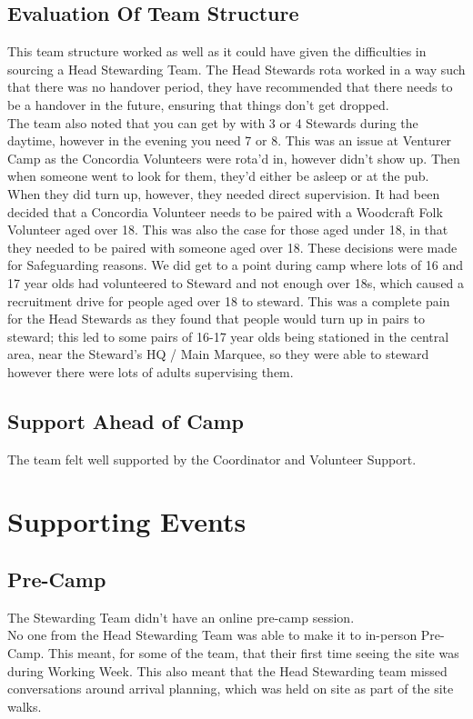 \subsection{Evaluation Of Team Structure}
This team structure worked as well as it could have given the difficulties in sourcing a Head Stewarding Team. The Head Stewards rota worked in a way such that there was no handover period, they have recommended that there needs to be a handover in the future, ensuring that things don't get dropped. \\

The team also noted that you can get by with 3 or 4 Stewards during the daytime, however in the evening you need 7 or 8. This was an issue at Venturer Camp as the Concordia Volunteers were rota'd in, however didn't show up. Then when someone went to look for them, they'd either be asleep or at the pub. When they did turn up, however, they needed direct supervision. It had been decided that a Concordia Volunteer needs to be paired with a Woodcraft Folk Volunteer aged over 18. This was also the case for those aged under 18, in that they needed to be paired with someone aged over 18. These decisions were made for Safeguarding reasons. We did get to a point during camp where lots of 16 and 17 year olds had volunteered to Steward and not enough over 18s, which caused a recruitment drive for people aged over 18 to steward. This was a complete pain for the Head Stewards as they found that people would turn up in pairs to steward; this led to some pairs of 16-17 year olds being stationed in the central area, near the Steward's HQ / Main Marquee, so they were able to steward however there were lots of adults supervising them.

\subsection{Support Ahead of Camp}
The team felt well supported by the Coordinator and Volunteer Support.

\section{Supporting Events}
\subsection{Pre-Camp}
The Stewarding Team didn't have an online pre-camp session.\\

No one from the Head Stewarding Team was able to make it to in-person Pre-Camp. This meant, for some of the team, that their first time seeing the site was during Working Week. This also meant that the Head Stewarding team missed conversations around arrival planning, which was held on site as part of the site walks.

